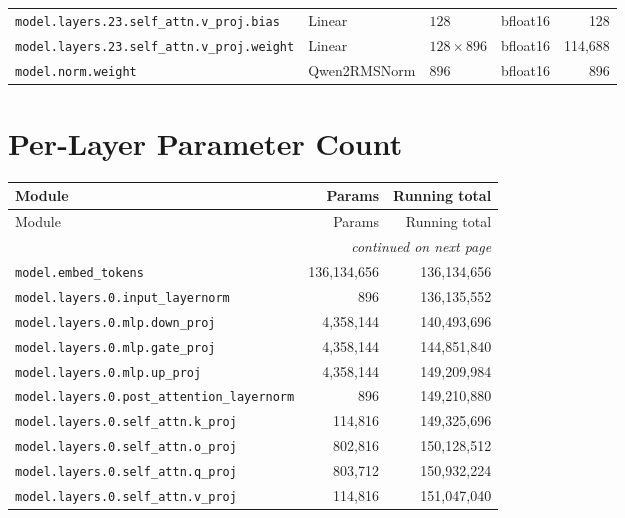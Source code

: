 \documentclass[10pt,a4paper]{article}
\theoremstyle{definition}
\begin{document}
\begin{appendices}
{\begin{longtable}{p{6.8cm}>{\raggedright\arraybackslash}p{3.3cm}llr}
\texttt{model.\allowbreak{}layers.\allowbreak{}23.\allowbreak{}self\_attn.\allowbreak{}v\_proj.\allowbreak{}bias} & Linear & $128$ & bfloat16 & 128 \\
\texttt{model.\allowbreak{}layers.\allowbreak{}23.\allowbreak{}self\_attn.\allowbreak{}v\_proj.\allowbreak{}weight} & Linear & $128 \times 896$ & bfloat16 & 114,688 \\
\texttt{model.\allowbreak{}norm.\allowbreak{}weight} & Qwen2\allowbreak{}RMSNorm & $896$ & bfloat16 & 896 \\
\end{longtable}
}
\section{Per-Layer Parameter Count}
\begin{longtable}{p{9.5cm}rr}
\toprule
Module & Params & Running total \\
\midrule
\endfirsthead
\toprule
Module & Params & Running total \\
\midrule
\endhead
\midrule \multicolumn{3}{r}{\textit{continued on next page}} \\
\endfoot
\bottomrule
\endlastfoot
\texttt{model.\allowbreak{}embed\_tokens} & 136,134,656 & 136,134,656 \\
\texttt{model.\allowbreak{}layers.\allowbreak{}0.\allowbreak{}input\_layernorm} & 896 & 136,135,552 \\
\texttt{model.\allowbreak{}layers.\allowbreak{}0.\allowbreak{}mlp.\allowbreak{}down\_proj} & 4,358,144 & 140,493,696 \\
\texttt{model.\allowbreak{}layers.\allowbreak{}0.\allowbreak{}mlp.\allowbreak{}gate\_proj} & 4,358,144 & 144,851,840 \\
\texttt{model.\allowbreak{}layers.\allowbreak{}0.\allowbreak{}mlp.\allowbreak{}up\_proj} & 4,358,144 & 149,209,984 \\
\texttt{model.\allowbreak{}layers.\allowbreak{}0.\allowbreak{}post\_attention\_layernorm} & 896 & 149,210,880 \\
\texttt{model.\allowbreak{}layers.\allowbreak{}0.\allowbreak{}self\_attn.\allowbreak{}k\_proj} & 114,816 & 149,325,696 \\
\texttt{model.\allowbreak{}layers.\allowbreak{}0.\allowbreak{}self\_attn.\allowbreak{}o\_proj} & 802,816 & 150,128,512 \\
\texttt{model.\allowbreak{}layers.\allowbreak{}0.\allowbreak{}self\_attn.\allowbreak{}q\_proj} & 803,712 & 150,932,224 \\
\texttt{model.\allowbreak{}layers.\allowbreak{}0.\allowbreak{}self\_attn.\allowbreak{}v\_proj} & 114,816 & 151,047,040 \\

\end{longtable}
\end{appendices}
\end{document}
